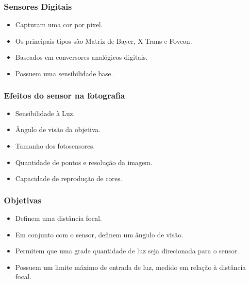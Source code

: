 






\begin{frame}
        \frametitle{Sensores Digitais}

        \begin{itemize}
            \item Capturam uma cor por pixel.
            \item Os principais tipos são Matriz de Bayer, X-Trans e Foveon.
            \item Baseados em conversores analógicos digitais.
            \item Possuem uma sensibilidade base.
        \end{itemize}
\end{frame}

\begin{frame}
    \frametitle{Efeitos do sensor na fotografia}

    \begin{itemize}
        \item Sensibilidade à Luz.
        \item Ângulo de visão da objetiva.
        \item Tamanho dos fotosensores.
        \item Quantidade de pontos e resolução da imagem.
        \item Capacidade de reprodução de cores.
    \end{itemize}
\end{frame}

\begin{frame}
    \frametitle{Objetivas}
    \begin{itemize}
        \item Definem uma distância focal.
        \item Em conjunto com o sensor, definem um ângulo de visão.
        \item Permitem que uma grade quantidade de luz seja direcionada para o sensor.
        \item Possuem um limite máximo de entrada de luz, medido em relação à distância focal.
    \end{itemize}
\end{frame}

